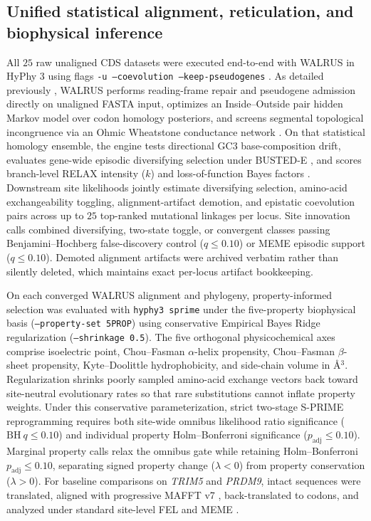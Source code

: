 \documentclass[12pt]{article}
\begin{document}
\subsection*{Unified statistical alignment, reticulation, and biophysical inference}

All $25$ raw unaligned CDS datasets were executed end-to-end with WALRUS in HyPhy 3 using flags \texttt{-u --coevolution --keep-pseudogenes} \cite{kosakovsky2026walrus}. As detailed previously \cite{kosakovsky2026walrus}, WALRUS performs reading-frame repair and pseudogene admission directly on unaligned FASTA input, optimizes an Inside--Outside pair hidden Markov model over codon homology posteriors, and screens segmental topological incongruence via an Ohmic Wheatstone conductance network \cite{pond2006gard}. On that statistical homology ensemble, the engine tests directional GC3 base-composition drift, evaluates gene-wide episodic diversifying selection under BUSTED-E \cite{selberg2024busted}, and scores branch-level RELAX intensity ($k$) and loss-of-function Bayes factors \cite{wertheim2015relax,smith2015less}. Downstream site likelihoods jointly estimate diversifying selection, amino-acid exchangeability toggling, alignment-artifact demotion, and epistatic coevolution pairs across up to $25$ top-ranked mutational linkages per locus. Site innovation calls combined diversifying, two-state toggle, or convergent classes passing Benjamini--Hochberg false-discovery control ($q \le 0.10$) or MEME episodic support ($q \le 0.10$). Demoted alignment artifacts were archived verbatim rather than silently deleted, which maintains exact per-locus artifact bookkeeping.

On each converged WALRUS alignment and phylogeny, property-informed selection was evaluated with \texttt{hyphy3 sprime} under the five-property biophysical basis (\texttt{--property-set 5PROP}) using conservative Empirical Bayes Ridge regularization (\texttt{--shrinkage 0.5}). The five orthogonal physicochemical axes comprise isoelectric point, Chou--Fasman $\alpha$-helix propensity, Chou--Fasman $\beta$-sheet propensity, Kyte--Doolittle hydrophobicity, and side-chain volume in \AA$^3$. Regularization shrinks poorly sampled amino-acid exchange vectors back toward site-neutral evolutionary rates so that rare substitutions cannot inflate property weights. Under this conservative parameterization, strict two-stage S-PRIME reprogramming requires both site-wide omnibus likelihood ratio significance ($\mathrm{BH}\ q \le 0.10$) and individual property Holm--Bonferroni significance ($p_{\mathrm{adj}} \le 0.10$). Marginal property calls relax the omnibus gate while retaining Holm--Bonferroni $p_{\mathrm{adj}} \le 0.10$, separating signed property change ($\lambda < 0$) from property conservation ($\lambda > 0$). For baseline comparisons on \textit{TRIM5} and \textit{PRDM9}, intact sequences were translated, aligned with progressive MAFFT v7 \cite{katoh2013mafft}, back-translated to codons, and analyzed under standard site-level FEL and MEME \cite{pond2005not,murrell2012detecting}.
\end{document}
